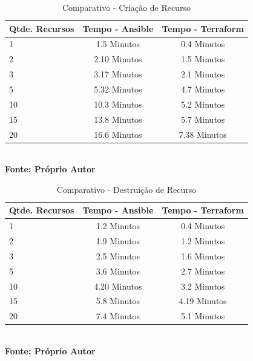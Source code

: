 \begin{table}[ht]
	\centering
	\caption{\hspace{0.1cm} Comparativo - Criação de Recurso}
	\vspace{-0.3cm} %
	\label{tab:tabela1}
	\begin{tabular}{l|c|c}
  \hline
    \textbf{Qtde. Recursos}	& \textbf{Tempo - Ansible} & \textbf{Tempo - Terraform} \\
    \hline
  1   & 1.5  Minutos   & 0.4  Minutos    \\
2   & 2.10  Minutos   & 1.5  Minutos    \\
3   & 3.17  Minutos   & 2.1  Minutos    \\
5   & 5.32  Minutos   & 4.7  Minutos     \\
10  & 10.3 Minutos   & 5.2  Minutos      \\
15  & 13.8  Minutos   & 5.7 Minutos      \\
20  & 16.6  Minutos   & 7.38  Minutos      \\

     \hline
 \end{tabular}
 	\vspace{.1cm}  %
	\small
	{\footnotesize\\ \textbf{Fonte: Próprio Autor}}
\end{table}


\begin{table}[ht]
	\centering
	\caption{\hspace{0.1cm} Comparativo - Destruição de Recurso}
	\vspace{-0.3cm} %
	\label{tab:tabela2}
	\begin{tabular}{l|c|c}
  \hline
    \textbf{Qtde. Recursos}	& \textbf{Tempo - Ansible} & \textbf{Tempo - Terraform} \\
    \hline
  1   & 1.2  Minutos   & 0.4  Minutos    \\
2   & 1.9    Minutos   & 1.2  Minutos    \\
3   & 2.5    Minutos   & 1.6  Minutos    \\
5   & 3.6    Minutos   & 2.7  Minutos     \\
10  & 4.20   Minutos   & 3.2  Minutos      \\
15  & 5.8    Minutos   & 4.19 Minutos      \\
20  & 7.4    Minutos   & 5.1  Minutos      \\

     \hline
 \end{tabular}
 	\vspace{.1cm}  %
	\small
	{\footnotesize\\ \textbf{Fonte: Próprio Autor}}
\end{table}


